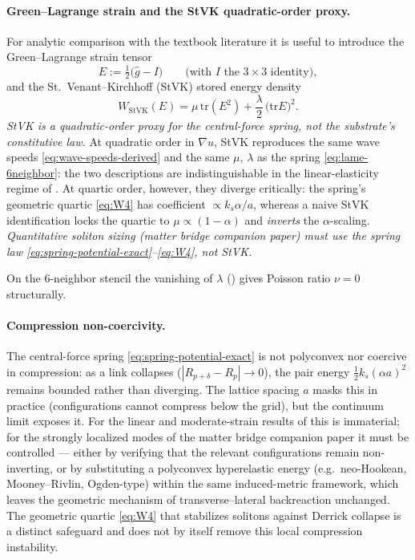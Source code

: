 \paragraph{Green--Lagrange strain and the StVK quadratic-order proxy.}
For analytic comparison with the textbook literature it is useful to introduce the
Green--Lagrange strain tensor
\begin{equation}
  E := \tfrac12\big(\widehat g - I\big)
  \qquad\text{(with $I$ the $3\times 3$ identity)},
  \label{eq:green-lagrange-strain}
\end{equation}
and the St.\ Venant--Kirchhoff (StVK) stored energy density
\begin{equation}
  W_{\text{StVK}}(E)
  = \mu\,\mathrm{tr}(E^2)+\frac{\lambda}{2}\,\big(\mathrm{tr}E\big)^2.
  \label{eq:stvk}
\end{equation}
\emph{StVK is a quadratic-order proxy for the central-force spring, not the substrate's
constitutive law.}
At quadratic order in $\nabla u$, StVK reproduces the same wave speeds \eqref{eq:wave-speeds-derived}
and the same $\mu$, $\lambda$ as the spring \eqref{eq:lame-6neighbor}: the two descriptions
are indistinguishable in the linear-elasticity regime of .
At quartic order, however, they diverge critically: the spring's geometric quartic
\eqref{eq:W4} has coefficient $\propto k_s\alpha/a$, whereas a naive StVK identification
locks the quartic to $\mu\propto(1-\alpha)$ and \emph{inverts} the $\alpha$-scaling.
\emph{Quantitative soliton sizing (matter bridge companion paper) must use the spring law
\eqref{eq:spring-potential-exact}--\eqref{eq:W4}, not StVK.}

On the 6-neighbor stencil the vanishing of $\lambda$ () gives Poisson ratio $\nu=0$ structurally.

\paragraph{Compression non-coercivity.}
The central-force spring \eqref{eq:spring-potential-exact} is not polyconvex nor coercive in
compression: as a link collapses ($|R_{p+\delta}-R_p|\to 0$), the pair energy
$\tfrac12 k_s(\alpha a)^2$ remains bounded rather than diverging.
The lattice spacing $a$ masks this in practice (configurations cannot compress below the
grid), but the continuum limit exposes it.
For the linear and moderate-strain results of 
this is immaterial; for the strongly localized modes of the matter bridge companion paper it must be
controlled --- either by verifying that the relevant configurations remain non-inverting, or
by substituting a polyconvex hyperelastic energy (e.g.\ neo-Hookean, Mooney--Rivlin,
Ogden-type) within the same induced-metric framework, which leaves the geometric mechanism
of transverse--lateral backreaction unchanged.
The geometric quartic \eqref{eq:W4} that stabilizes solitons against Derrick collapse is
a distinct safeguard and does not by itself remove this local compression instability.

